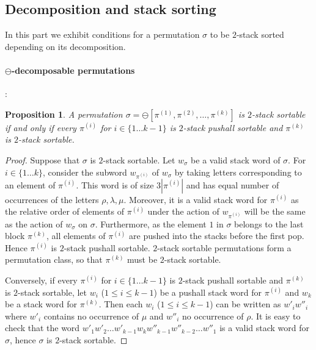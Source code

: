 \documentclass[11pt]{article}
\newtheorem{prop}[thm]{Proposition}
\begin{document}
\subsection{Decomposition and stack sorting}

In this part we exhibit conditions for a permutation $\sigma$ to be $2$-stack sorted depending on its decomposition. 

\paragraph{$\ominus$-decomposable permutations}: 
\begin{prop}\label{prop:2stacksMoinsDecomposable}
A permutation $\sigma = \ominus[\pi^{(1)},\pi^{(2)},\ldots, \pi^{(k)}]$ is $2$-stack sortable if and only if every $\pi^{(i)}$ for $i \in \{ 1 \ldots k-1\}$ is $2$-stack pushall sortable and $\pi^{(k)}$ is $2$-stack sortable.
\end{prop}
\begin{proof}
Suppose that $\sigma$ is $2$-stack sortable. Let $w_{\sigma}$ be a valid stack word of $\sigma$.
For $i \in \{ 1 \ldots k\}$, consider the subword $w_{\pi^{(i)}}$ of $w_{\sigma}$ by taking letters corresponding to an element of $\pi^{(i)}$. 
This word is of size $3|\pi^{(i)}|$ and has equal number of occurrences of the letters $\rho, \lambda, \mu$. 
Moreover, it is a valid stack word for $\pi^{(i)}$ as the relative order of elements of $\pi^{(i)}$ under the action of $w_{\pi^{(i)}}$ will be the same as the action of $w_{\sigma}$ on $\sigma$. 
Furthermore, as the element $1$ in $\sigma$ belongs to the last block $\pi^{(k)}$, all elements of $\pi^{(i)}$ are pushed into the stacks before the first pop. 
Hence $\pi^{(i)}$ is $2$-stack pushall sortable. 
$2$-stack sortable permutations form a permutation class, so that $\pi^{(k)}$ must be $2$-stack sortable.

Conversely, if every $\pi^{(i)}$ for $i \in \{ 1 \ldots k-1\}$ is $2$-stack pushall sortable and $\pi^{(k)}$ is $2$-stack sortable, let $w_i$ ($1 \leq i \leq k-1$) be a pushall stack word for $\pi^{(i)}$ and $w_k$ be a stack word for $\pi^{(k)}$. 
Then each $w_i$ ($1 \leq i \leq k-1$) can be written as $w'_iw''_i$ where $w'_i$ contains no occurrence of $\mu$ and $w''_i$ no occurrence of $\rho$.
It is easy to check that the word $w'_1w'_2\ldots w'_{k-1} w_k w''_{k-1} w''_{k-2} \ldots w''_1$ is a valid stack word for $\sigma$, hence $\sigma$ is $2$-stack sortable.
\end{proof}
\end{document}
